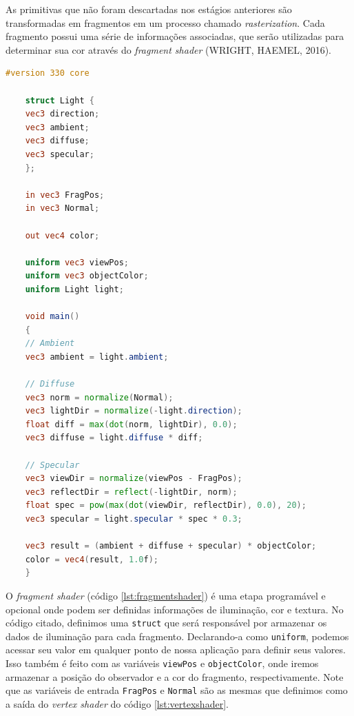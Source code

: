 As primitivas que não foram descartadas nos estágios anteriores são transformadas em fragmentos em um processo chamado \textit{rasterization}. Cada fragmento possui uma série de informações associadas, que serão utilizadas para determinar sua cor através do \textit{fragment shader} (WRIGHT, HAEMEL, 2016).

\begin{lstlisting}[language=glsl,
label={lst:fragmentshader},
caption="Exemplo de \textit{fragment shader}"]
	#version 330 core
	
	struct Light {
	vec3 direction;
	vec3 ambient;
	vec3 diffuse;
	vec3 specular;
	};
	
	in vec3 FragPos;  
	in vec3 Normal;  
	
	out vec4 color;
	
	uniform vec3 viewPos;
	uniform vec3 objectColor;
	uniform Light light;
	
	void main()
	{
	// Ambient
	vec3 ambient = light.ambient;
	
	// Diffuse 
	vec3 norm = normalize(Normal);
	vec3 lightDir = normalize(-light.direction); 
	float diff = max(dot(norm, lightDir), 0.0);
	vec3 diffuse = light.diffuse * diff;
	
	// Specular
	vec3 viewDir = normalize(viewPos - FragPos);
	vec3 reflectDir = reflect(-lightDir, norm);  
	float spec = pow(max(dot(viewDir, reflectDir), 0.0), 20);
	vec3 specular = light.specular * spec * 0.3;  
	
	vec3 result = (ambient + diffuse + specular) * objectColor;
	color = vec4(result, 1.0f);
	} 
\end{lstlisting}

O \textit{fragment shader} (código \ref{lst:fragmentshader}) é uma etapa programável e opcional onde podem ser definidas informações de iluminação, cor e textura. No código citado, definimos uma \lstinline{struct} que será responsável por armazenar os dados de iluminação para cada fragmento. Declarando-a como \lstinline{uniform}, podemos acessar seu valor em qualquer ponto de nossa aplicação para definir seus valores. Isso também é feito com as variáveis \lstinline{viewPos} e \lstinline{objectColor}, onde iremos armazenar a posição do observador e a cor do fragmento, respectivamente. Note que as variáveis de entrada \lstinline{FragPos} e \lstinline{Normal} são as mesmas que definimos como a saída do \textit{vertex shader} do código \ref{lst:vertexshader}.
